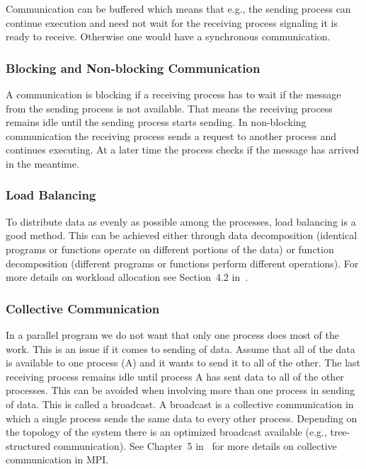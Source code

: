 Communication can be buffered which means that e.g., the sending
process can continue execution and need not wait for the receiving
process signaling it is ready to receive. Otherwise one would have a
synchronous communication. 

\subsubsection{Blocking and Non-blocking Communication}

A communication is blocking if a receiving process has to wait if the
message from the sending process is not available. That means the
receiving process remains idle until the sending process starts
sending. In non-blocking communication the receiving process sends a
request to another process and continues executing. At a later time
the process checks if the message has arrived in the meantime. 

\subsubsection{Load Balancing}

To distribute data as evenly as possible among the processes, load
balancing is a good method. This can be achieved either through data
decomposition (identical programs or functions operate on different
portions of the data) or function decomposition (different programs or
functions perform different operations). For more details on workload
allocation see Section~4.2 in~\cite{geist94pvm}.

\subsubsection{Collective Communication}

In a parallel program we do not want that only one process does most of
the work. This is an issue if it comes to sending of data. Assume that
all of the data is available to one process (A) and it wants to send it to
all of the other. The last receiving process remains idle until
process A has sent data to all of the other processes. This can be
avoided when involving more than one process in sending of data. This
is called a broadcast.
A broadcast is a collective communication in which a single process
sends the same data to every other process. Depending on the topology
of the system there is an optimized broadcast available
(e.g., tree-structured communication). See Chapter~5
in~\cite{pacheco97mpi} for more details on collective communication in
MPI.

